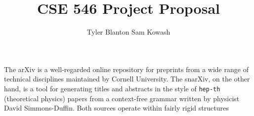 \documentclass[11pt,letterpaper]{article}
\author{Tyler Blanton \quad Sam Kowash}
\title{CSE 546 Project Proposal}
\numberwithin{equation}{section}
\numberwithin{figure}{section}
\begin{document}
\maketitle

The arXiv is a well-regarded online repository for preprints from a wide range of technical disciplines maintained by Cornell University.  The snarXiv, on the other hand, is a tool for generating titles and abstracts in the style of \texttt{hep-th} (theoretical physics) papers from a context-free grammar written by physicist David Simmons-Duffin. Both sources operate within fairly rigid structures
\end{document}

